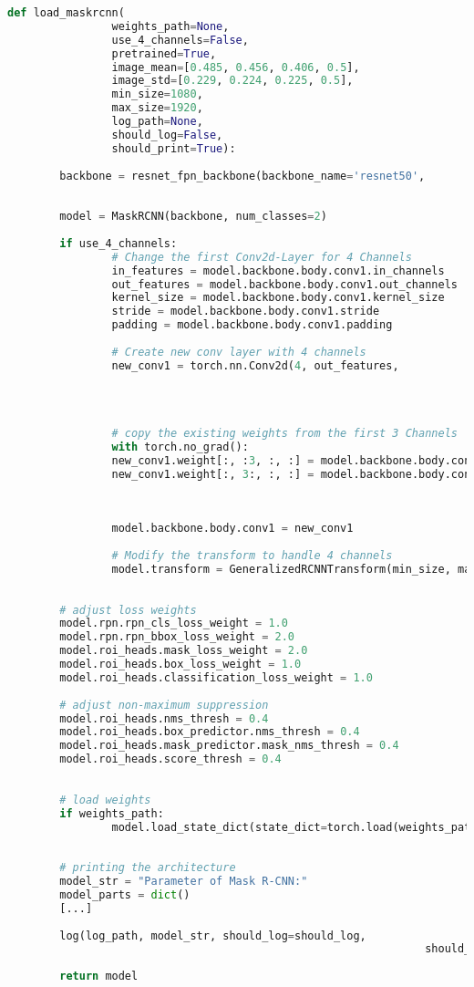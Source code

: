 		\begin{lstlisting}[language=Python,caption=Loading function of Mask R-CNN using torchvision, label=lst:model-loading]
def load_maskrcnn(
				weights_path=None, 
				use_4_channels=False, 
				pretrained=True,
				image_mean=[0.485, 0.456, 0.406, 0.5], 
				image_std=[0.229, 0.224, 0.225, 0.5],    
				min_size=1080, 
				max_size=1920, 
				log_path=None, 
				should_log=False, 
				should_print=True):
		
		backbone = resnet_fpn_backbone(backbone_name='resnet50',
																			weights=ResNet50_Weights.IMAGENET1K_V2
																			) 
		model = MaskRCNN(backbone, num_classes=2)  
		
		if use_4_channels:
				# Change the first Conv2d-Layer for 4 Channels
				in_features = model.backbone.body.conv1.in_channels    
				out_features = model.backbone.body.conv1.out_channels
				kernel_size = model.backbone.body.conv1.kernel_size
				stride = model.backbone.body.conv1.stride
				padding = model.backbone.body.conv1.padding
				
				# Create new conv layer with 4 channels
				new_conv1 = torch.nn.Conv2d(4, out_features,
																				kernel_size=kernel_size, 
																				stride=stride, 
																				padding=padding)
				
				# copy the existing weights from the first 3 Channels
				with torch.no_grad():
				new_conv1.weight[:, :3, :, :] = model.backbone.body.conv1.weight  # Copy old 3 Channels
				new_conv1.weight[:, 3:, :, :] = model.backbone.body.conv1.weight
																														[:, :1, :, :]
				
				
				model.backbone.body.conv1 = new_conv1
				
				# Modify the transform to handle 4 channels
				model.transform = GeneralizedRCNNTransform(min_size, max_size, 
																										image_mean, image_std)
		
		# adjust loss weights
		model.rpn.rpn_cls_loss_weight = 1.0
		model.rpn.rpn_bbox_loss_weight = 2.0
		model.roi_heads.mask_loss_weight = 2.0
		model.roi_heads.box_loss_weight = 1.0
		model.roi_heads.classification_loss_weight = 1.0
		
		# adjust non-maximum suppression
		model.roi_heads.nms_thresh = 0.4
		model.roi_heads.box_predictor.nms_thresh = 0.4  
		model.roi_heads.mask_predictor.mask_nms_thresh = 0.4
		model.roi_heads.score_thresh = 0.4
		
		
		# load weights
		if weights_path:
				model.load_state_dict(state_dict=torch.load(weights_path, 
																												weights_only=True)) 
		
		# printing the architecture
		model_str = "Parameter of Mask R-CNN:"
		model_parts = dict()
		[...]
		
		log(log_path, model_str, should_log=should_log, 
																should_print=should_print)
		
		return model
		\end{lstlisting}
		
